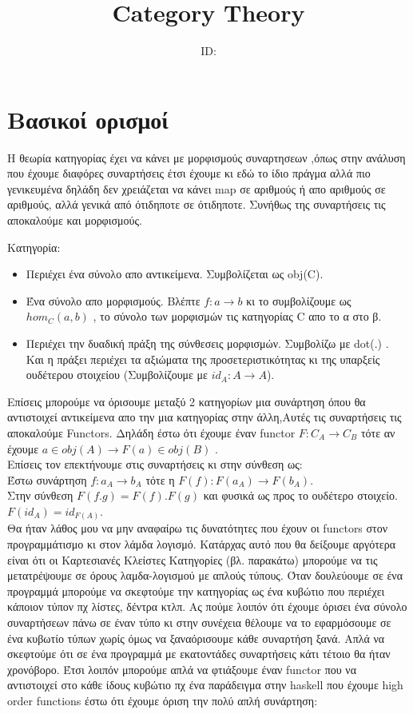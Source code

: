 \documentclass{article}
\title{Category Theory \\}
\author{\studentname \qquad  ID: \suid}
\begin{document}
\maketitle
\section*{Βασικοί ορισμοί}

Η θεωρία κατηγορίας έχει να κάνει με μορφισμούς συναρτησεων ,όπως στην ανάλυση που έχουμε διαφόρες συναρτήσεις έτσι έχουμε κι εδώ το ίδιο πράγμα αλλά πιο γενικευμένα δηλάδη δεν χρειάζεται να κάνει map σε αριθμούς ή απο αριθμούς σε αριθμούς, αλλά γενικά από ότιδηποτε σε ότιδηποτε. Συνήθως της συναρτήσεις τις αποκαλούμε και μορφισμούς.

\large {Κατηγορία:}
\begin{itemize}
	\item  Περιέχει ένα σύνολο απο αντικείμενα. Συμβολίζεται ως obj(C).
	\item Ένα σύνολο απο μορφισμούς. Βλέπτε $f:a\rightarrow b$ κι το συμβολίζουμε ως$hom_C(a,b)$ , το σύνολο των μορφισμών τις κατηγορίας C απο το α στο β.
	\item Περιέχει την δυαδική πράξη της σύνθεσεις μορφισμών. Συμβολίζω με dot(.) . Και η πράξει περιέχει τα αξιώματα της προσετεριστικότητας κι της υπαρξείς ουδέτερου στοιχείου (Συμβολίζουμε με $id_A : A\rightarrow A$). 
	\end{itemize}
Επίσεις μπορούμε να όρισουμε μεταξύ 2 κατηγορίων μια συνάρτηση όπου θα αντιστοιχεί αντικείμενα απο την μια κατηγορίας στην άλλη,Αυτές τις συναρτήσεις τις αποκαλούμε Functors. 
Δηλάδη έστω ότι έχουμε έναν functor $F: C_A \rightarrow C_B$ τότε αν έχουμε $a \in obj(A) \rightarrow F(a)\in obj(B)$ .
\\Επίσεις τον επεκτήνουμε στις συναρτήσεις κι στην σύνθεση ως: \\
Έστω συνάρτηση $f: a_A \rightarrow b_A$ τότε η $F(f):F(a_A)\rightarrow F(b_A)$.\\
Στην σύνθεση $F(f.g)=F(f).F(g)$ και φυσικά ως προς το ουδέτερο στοιχείο.
$F(id_A)=id_{F(A)}$.\\
Θα ήταν λάθος μου να μην αναφαίρω τις δυνατότητες που έχουν οι functors στον προγραμμάτισμο κι στον λάμδα λογισμό. Κατάρχας αυτό που θα δείξουμε αργότερα είναι ότι οι Καρτεσιανές Κλείστες Κατηγορίες (βλ. παρακάτω) μπορούμε να τις μετατρέψουμε σε όρους λαμδα-λογισμού με απλούς τύπους. 
Όταν δουλεύουμε σε ένα προγραμμά μπορούμε να σκεφτούμε την κατηγορίας ως ένα κυβώτιο που περιέχει κάποιον τύπον πχ λίστες, δέντρα κτλπ. Ας πούμε λοιπόν ότι έχουμε όρισει ένα σύνολο συναρτήσεων πάνω σε έναν τύπο κι στην συνέχεια θέλουμε να το εφαρμόσουμε σε ένα κυβωτίο τύπων χωρίς όμως να ξαναόρισουμε κάθε συναρτήση ξανά. Απλά να σκεφτούμε ότι σε ένα προγραμμά με εκατοντάδες συναρτήσεις κάτι τέτοιο θα ήταν χρονόβορο. Έτσι λοιπόν μπορούμε απλά να φτιάξουμε έναν functor που να αντιστοιχεί στο κάθε ίδους κυβώτιο πχ ένα παράδειγμα στην  haskell που έχουμε high order functions έστω ότι έχουμε όριση την πολύ απλή συνάρτηση:
\end{document}
